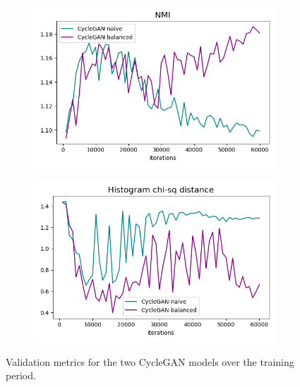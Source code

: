 \begin{figure}[h!]
{\begin{subfigure}{.5\textwidth}
            \includegraphics[width=\linewidth]{figures/Expt_2/gan_convergence/metric_val_nmi.png}
            \caption{}
            \label{fig:metric_val_nmi}
        \end{subfigure}
        \begin{subfigure}{.5\textwidth}
            \centering
            \includegraphics[width=\linewidth]{figures/Expt_2/gan_convergence/metric_val_histogram_chi2.png}
            \caption{}
            \label{fig:metric_val_histogram_chi2}
        \end{subfigure}
    }
    \caption{Validation metrics for the two CycleGAN models over the training period.}
    \label{fig:cyclegan_metrics}
\end{figure}{}

